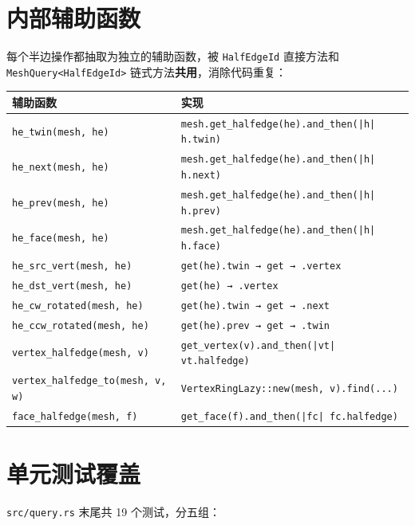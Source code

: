\documentclass[11pt,a4paper]{article}
\begin{document}
\section{内部辅助函数}

每个半边操作都抽取为独立的辅助函数，被 \texttt{HalfEdgeId} 直接方法和
\texttt{MeshQuery<HalfEdgeId>} 链式方法\textbf{共用}，消除代码重复：

\begin{center}
\renewcommand{\arraystretch}{1.18}
\begin{tabular}{@{}ll@{}}
  \toprule
  \textbf{辅助函数} & \textbf{实现} \\
  \midrule
  \texttt{he\_twin(mesh, he)}    & \texttt{mesh.get\_halfedge(he).and\_then(|h| h.twin)} \\
  \texttt{he\_next(mesh, he)}    & \texttt{mesh.get\_halfedge(he).and\_then(|h| h.next)} \\
  \texttt{he\_prev(mesh, he)}    & \texttt{mesh.get\_halfedge(he).and\_then(|h| h.prev)} \\
  \texttt{he\_face(mesh, he)}    & \texttt{mesh.get\_halfedge(he).and\_then(|h| h.face)} \\
  \texttt{he\_src\_vert(mesh, he)} & \texttt{get(he).twin → get → .vertex} \\
  \texttt{he\_dst\_vert(mesh, he)} & \texttt{get(he) → .vertex} \\
  \texttt{he\_cw\_rotated(mesh, he)} & \texttt{get(he).twin → get → .next} \\
  \texttt{he\_ccw\_rotated(mesh, he)} & \texttt{get(he).prev → get → .twin} \\
  \texttt{vertex\_halfedge(mesh, v)} & \texttt{get\_vertex(v).and\_then(|vt| vt.halfedge)} \\
  \texttt{vertex\_halfedge\_to(mesh, v, w)} & \texttt{VertexRingLazy::new(mesh, v).find(...)} \\
  \texttt{face\_halfedge(mesh, f)} & \texttt{get\_face(f).and\_then(|fc| fc.halfedge)} \\
  \bottomrule
\end{tabular}
\end{center}

\section{单元测试覆盖}

\texttt{src/query.rs} 末尾共 19 个测试，分五组：
\end{document}

